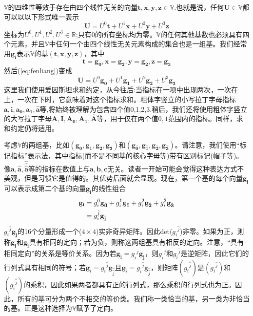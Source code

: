 \documentclass[utf8]{ctexbook}
\numberwithin{equation}{section}
\begin{document}
\(\mathbb{V}\)的四维性等效于存在由四个线性无关的向量$\mathbf{t},\mathbf{x},\mathbf{y},\mathbf{z}\in\mathbb{V}$.也就是说，任何$\mathbf{U}\in\mathbb{V}$都可以以以下形式唯一表示
\begin{equation}
    \mathbf{U}=U^0\mathbf{t}+U^1\mathbf{x}+U^2\mathbf{y}+U^3\mathbf{z} \label{eq:fenliang}
\end{equation}
坐标为$U^0,U^1,U^2,U^3\in\mathbb{R}$;只有0的所有坐标均为零。$\mathbb{V}$的任何其他基数也必须具有四个元素，并且$\mathbb{V}$中任何一个由四个线性无关元素构成的集合也是一组基。我们经常用$\mathbf{g_i}$表示$\mathbb{V}$的基$(\mathbf{t},\mathbf{x},\mathbf{y},\mathbf{z})$，其中
\begin{equation}
    \mathbf{t}=\mathbf{g_0},\mathbf{x}=\mathbf{g_2},\mathbf{y}=\mathbf{g_2},\mathbf{z}=\mathbf{g_3} \label{eq:113}
\end{equation}
然后(\ref{eq:fenliang})变成
\begin{equation}
    \mathbf{U}=U^0\mathbf{g_0}+U^1\mathbf{g_1}+U^2\mathbf{g_2}+U^3\mathbf{g_3}\label{eq:114}
\end{equation}
这里我们使用爱因斯坦求和约定，从今往后:当指标在一项中出现两次，一次在上，一次在下时，它意味着对这个指标求和。粗体字竖立的小写拉丁字母指标$\mathbf{a},\mathbf{i},\mathbf{a_0},\mathbf{a_1},\mathbf{\hat{a}}$等,将始终被理解为包含四个值0,1,2,3.稍后，我们还将使用粗体字竖立的大写拉丁字母$\mathbf{A},\mathbf{I},\mathbf{A_0},\mathbf{A_1},\mathbf{\hat{A}}$等，用于仅在两个值$0,1$范围内的指标。同样，求和约定仍将适用。

考虑$\mathbb{V}$的两组基，比如$(\mathbf{g_0},\mathbf{g_1},\mathbf{g_2},\mathbf{g_3})$和$(\mathbf{g_{\hat{0}}},\mathbf{g_{\hat{1}}},\mathbf{g_{\hat{2}}},\mathbf{g_{\hat{3}}})$。请注意，我们使用“标记指标”表示法，其中指标(而不是不同基的核心字母等)带有区别标记(帽子等)。像$\mathbf{a},\mathbf{\hat{a}},\mathbf{\hat{\hat{\hat{a}}}}$等的指标在数值上与$\mathbf{a},\mathbf{b},\mathbf{c}$无关。读者一开始可能会觉得这种表达方式不美观，但是习惯它是值得的。其优势后面就会显现。现在，第一个基的每个向量$\mathbf{g_i}$可以表示成第二个基的向量$\mathbf{g_{\hat{i}}}$的线性组合
\begin{align}
    \mathbf{g_i}&=g_{i}^{\hat{0}}\mathbf{g_{\hat{0}}}+{g_{i}^{\hat{1}}}\mathbf{g_{\hat{1}}}+{g_{i}^{\hat{2}}}\mathbf{g_{\hat{2}}}+{g_{i}^{\hat{3}}}\mathbf{g_{\hat{3}}}\notag \\
    &={g_{i}^{\hat{j}}}\mathbf{g_{\hat{j}}}
\end{align}
${g_{i}{}^{\hat{j}}}\mathbf{g_{\hat{j}}}$的16个分量形成一个($4 \times 4$)实非奇异矩阵。因此det(${g_{i}{}^{\hat{j}}{}}$)非零。如果为正，则称\(\mathbf{g_i}\)和\(\mathbf{g_{\hat{i}}}\)具有相同的定向；若为负，则称这两组基具有相反的定向。注意，“具有相同定向”的关系是等价关系。因为若$\mathbf{g_{\hat{i}}}=g_{\hat{i}}{}^{j}\mathbf{g_{j}}$，则$g_{\hat{i}}{}^j$和$g_{i}{}^{\hat{j}}$是逆矩阵，因此它们的行列式具有相同的符号；若\(\mathbf{g}_i=g_{i}{}^{\hat{\hat{j}}}\mathbf{g}_{\hat{\hat{j}}}\)且\(\mathbf{g}_{\hat{i}}=g_{\hat{i}}{}^{\hat{\hat{j}}}\mathbf{g}_{\hat{\hat{j}}}\)，则矩阵$(g_{i}{}^{\hat{\hat{j}}})$是$(g_{i}{}^{\hat{j}})$和$(g_{\hat{i}}{}^{\hat{\hat{j}}})$的乘积，因此如果两者都具有正的行列式，那么乘积的行列式也为正。因此，所有的基可分为两个不相交的等价类。我们称一类恰当的基，另一类为非恰当的基。正是这种选择为$\mathbb{V}$赋予了定向。
\end{document}
